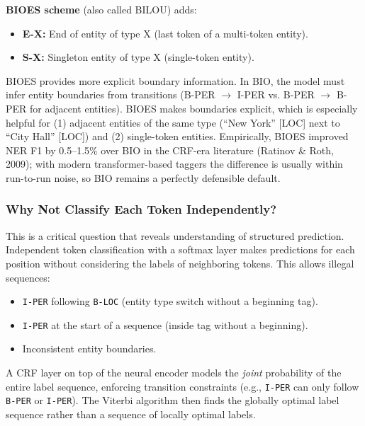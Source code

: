 \textbf{BIOES scheme} (also called BILOU) adds:
\begin{itemize}
    \item \textbf{E-X:} End of entity of type X (last token of a multi-token entity).
    \item \textbf{S-X:} Singleton entity of type X (single-token entity).
\end{itemize}

\begin{keyinsight}
BIOES provides more explicit boundary information. In BIO, the model must infer entity
boundaries from transitions (B-PER $\to$ I-PER vs. B-PER $\to$ B-PER for adjacent
entities). BIOES makes boundaries explicit, which is especially helpful for (1) adjacent
entities of the same type (``New York'' [LOC] next to ``City Hall'' [LOC]) and (2)
single-token entities. Empirically, BIOES improved NER F1 by 0.5--1.5\% over BIO in the
CRF-era literature (Ratinov \& Roth, 2009); with modern transformer-based taggers the
difference is usually within run-to-run noise, so BIO remains a perfectly defensible
default.
\end{keyinsight}

\subsubsection{Why Not Classify Each Token Independently?}

This is a critical question that reveals understanding of structured prediction.
Independent token classification with a softmax layer makes predictions for each position
without considering the labels of neighboring tokens. This allows illegal sequences:
\begin{itemize}
    \item \texttt{I-PER} following \texttt{B-LOC} (entity type switch without a beginning
    tag).
    \item \texttt{I-PER} at the start of a sequence (inside tag without a beginning).
    \item Inconsistent entity boundaries.
\end{itemize}

A CRF layer on top of the neural encoder models the \emph{joint} probability of the
entire label sequence, enforcing transition constraints (e.g., \texttt{I-PER} can only
follow \texttt{B-PER} or \texttt{I-PER}). The Viterbi algorithm then finds the globally
optimal label sequence rather than a sequence of locally optimal labels.

